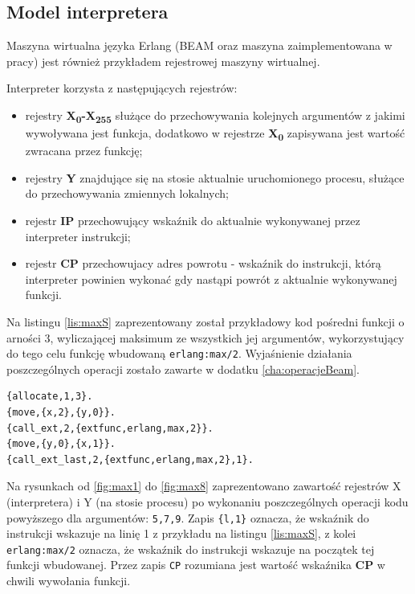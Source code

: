 \subsection{Model interpretera}
\label{sub:interpreterModel}

Maszyna wirtualna języka Erlang (BEAM oraz maszyna zaimplementowana w pracy) jest również przykładem rejestrowej maszyny wirtualnej.

Interpreter korzysta z następujących rejestrów:
\begin{itemize}
\item rejestry \textbf{X\textsubscript{0}-X\textsubscript{255}} służące do przechowywania kolejnych argumentów z jakimi wywoływana jest funkcja, dodatkowo w rejestrze \textbf{X\textsubscript{0}} zapisywana jest wartość zwracana przez funkcję;
\item rejestry \textbf{Y} znajdujące się na stosie aktualnie uruchomionego procesu, służące do przechowywania zmiennych lokalnych;
\item rejestr \textbf{IP} przechowujący wskaźnik do aktualnie wykonywanej przez interpreter instrukcji;
\item rejestr \textbf{CP} przechowujacy adres powrotu - wskaźnik do instrukcji, którą interpreter powinien wykonać gdy nastąpi powrót z aktualnie wykonywanej funkcji.
\end{itemize}

Na listingu \ref{lis:maxS} zaprezentowany został przykładowy kod pośredni funkcji o arności 3, wyliczającej maksimum ze wszystkich jej argumentów, wykorzystujący do tego celu funkcję wbudowaną \texttt{erlang:max/2}. Wyjaśnienie działania poszczególnych operacji zostało zawarte w dodatku \ref{cha:operacjeBeam}.

\begin{lstlisting}[style=erlang, caption=Fragment kodu pośredniego liczącego maksimum z trzech wyrażeń modułu, label=lis:maxS]
{allocate,1,3}.
{move,{x,2},{y,0}}.
{call_ext,2,{extfunc,erlang,max,2}}.
{move,{y,0},{x,1}}.
{call_ext_last,2,{extfunc,erlang,max,2},1}.
\end{lstlisting}

Na rysunkach od \ref{fig:max1} do \ref{fig:max8} zaprezentowano zawartość rejestrów X (interpretera) i Y (na stosie procesu) po wykonaniu poszczególnych operacji kodu powyższego dla argumentów: \texttt{5,7,9}. Zapis \texttt{\{l,1\}} oznacza, że wskaźnik do instrukcji wskazuje na linię 1 z przykładu na listingu \ref{lis:maxS}, z kolei \texttt{erlang:max/2} oznacza, że wskaźnik do instrukcji wskazuje na początek tej funkcji wbudowanej. Przez zapis \texttt{CP} rozumiana jest wartość wskaźnika \textbf{CP} w chwili wywołania funkcji. 

